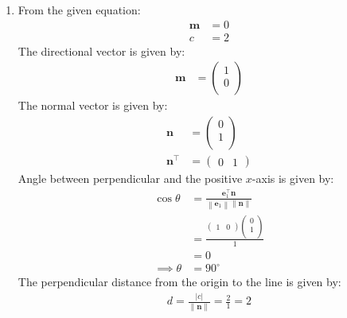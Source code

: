 \documentclass[12pt]{article}
\providecommand{\norm}[1]{\left\lVert#1\right\rVert}
\newcommand{\myvec}[1]{\ensuremath{\begin{pmatrix}#1\end{pmatrix}}}
\let\vec\mathbf
\begin{document}
\begin{enumerate}
\begin{figure}[H]
\begin{center}
	\end{center}
\caption{}
\label{fig:Fig1}
\end{figure}
\item From the given equation:
         \begin{align}                                                                                                 \vec{m}&=0\\                                                                        			c&=2
         \end{align}                                                                                          The directional vector is given by:
          \begin{align}
                  \vec{m}&=\myvec{1\\0\\}
          \end{align}
          The normal vector is given by:
                  \begin{align}
         \vec{n}&=\myvec{0\\1\\}\\
          \vec{n}^\top&=\myvec{0 & 1}
                          \end{align}
          Angle between perpendicular and the positive $x$-axis is given by:
		\begin{align}  
\cos\theta&=\frac{\vec{e}_{1}^\top\vec{n}}{\norm{\vec{e}_{1}}\norm{\vec{n}}}\\
			&=\frac{\myvec{1&0}\myvec{0 \\ 1\\}}{1}\\
			&=0\\
			\implies	\theta&=90^\circ             
                \end{align}      
 The perpendicular distance from the origin to the line is given by:    
                                      \begin{align}
					      d=\frac{|c|}{\norm{\vec{n}}}=\frac{2}{1}=2             
                  \end{align}
\begin{figure}[H]
\begin{center} 

\end{center}
\end{figure}
\end{enumerate}
\end{document}
